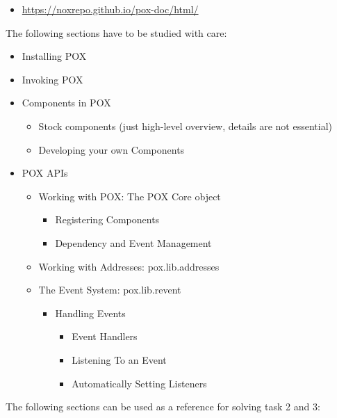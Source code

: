 \documentclass[a4paper]{article}
\begin{document}
\begin{itemize}
\item \url{https://noxrepo.github.io/pox-doc/html/}
\end{itemize}

The following sections have to be studied with care:
\begin{itemize}
\item    Installing POX
\item    Invoking POX
\item    Components in POX
\begin{itemize}
\item        Stock components (just high-level overview, details are not essential)
\item        Developing your own Components 
\end{itemize}
\item    POX APIs
\begin{itemize}
\item        Working with POX: The POX Core object
\begin{itemize}
\item            Registering Components
\item            Dependency and Event Management 
\end{itemize}
\item        Working with Addresses: pox.lib.addresses
\item        The Event System: pox.lib.revent
\begin{itemize}
\item            Handling Events
\begin{itemize}
\item                Event Handlers
\item                Listening To an Event
\item                Automatically Setting Listeners 
\end{itemize}
\end{itemize}
\end{itemize}
\end{itemize}

The following sections can be used as a reference for solving task 2 and 3:
\end{document}
